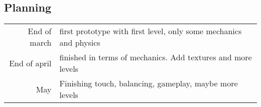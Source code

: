 \documentclass[a4paper, 10pt]{article}
\begin{document}
	\subsection{Planning}
	\vspace{10pt}
	\begin{tabular}{rl}
		End of march & first prototype with first level, only some mechanics and physics \\
		End of april & finished in terms of mechanics. Add textures and more levels\\
		May & Finishing touch, balancing, gameplay, maybe more levels\\
	\end{tabular}
\end{document}
